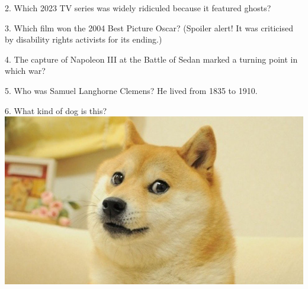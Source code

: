 \begin{frame}
\begin{center}
\Large
2. Which 2023 TV series was widely ridiculed because it featured ghosts?
\\
\end{center}
\end{frame}
\begin{frame}
\begin{center}
\Large
3. Which film won the 2004 Best Picture Oscar? (Spoiler alert! It was criticised by disability rights activists for its ending.)
\\
\end{center}
\end{frame}
\begin{frame}
\begin{center}
\Large
4. The capture of Napoleon III at the Battle of Sedan marked a turning point in which war?
\\
\end{center}
\end{frame}
\begin{frame}
\begin{center}
\Large
5. Who was Samuel Langhorne Clemens? He lived from 1835 to 1910.
\\
\end{center}
\end{frame}
\begin{frame}
\begin{center}
\Large
6. What kind of dog is this?
\\
\vspace{0.5em}\includegraphics[height=0.6\paperheight]{images/doge.jpg}
\\
\end{center}
\end{frame}
